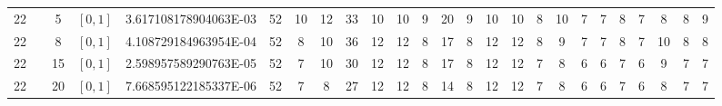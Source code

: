 \documentclass{article}
\begin{document}
\begin{landscape}
\begin{longtable}{ccccccccccccccccccccccccc}
  22 &  & 5          & $[0,1]$ & 3.617108178904063E-03 & \cellcolor{red!75} 52        &\cellcolor{green!5} 10        &\cellcolor{green!5} 12        &\cellcolor{red!5} 33        &\cellcolor{green!5} 10        &\cellcolor{green!5} 10        &\cellcolor{green!5} 9         &\cellcolor{red!5} 20        &\cellcolor{green!5} 9         &\cellcolor{green!5} 10        &\cellcolor{green!5} 10        &\cellcolor{green!5} 8         &\cellcolor{green!5} 10        &\cellcolor{green!25} 7         &\cellcolor{green!25} 7         &\cellcolor{green!5} 8         &\cellcolor{green!25} 7         &\cellcolor{green!5} 8         &\cellcolor{green!5} 8         &\cellcolor{green!5} 9\\
  22 &  & 8          & $[0,1]$ & 4.108729184963954E-04 & \cellcolor{red!75} 52        &\cellcolor{green!5} 8         &\cellcolor{green!5} 10        &\cellcolor{red!5} 36        &\cellcolor{green!5} 12        &\cellcolor{green!5} 12        &\cellcolor{green!5} 8         &\cellcolor{red!5} 17        &\cellcolor{green!5} 8         &\cellcolor{green!5} 12        &\cellcolor{green!5} 12        &\cellcolor{green!5} 8         &\cellcolor{green!5} 9         &\cellcolor{green!25} 7         &\cellcolor{green!25} 7         &\cellcolor{green!5} 8         &\cellcolor{green!25} 7         &\cellcolor{green!5} 10        &\cellcolor{green!5} 8         &\cellcolor{green!5} 8\\
  22 &  & 15         & $[0,1]$ & 2.598957589290763E-05 & \cellcolor{red!75} 52        &\cellcolor{green!5} 7         &\cellcolor{green!5} 10        &\cellcolor{red!5} 30        &\cellcolor{red!5} 12        &\cellcolor{red!5} 12        &\cellcolor{green!5} 8         &\cellcolor{red!5} 17        &\cellcolor{green!5} 8         &\cellcolor{red!5} 12        &\cellcolor{red!5} 12        &\cellcolor{green!5} 7         &\cellcolor{green!5} 8         &\cellcolor{green!25} 6         &\cellcolor{green!25} 6         &\cellcolor{green!5} 7         &\cellcolor{green!25} 6         &\cellcolor{green!5} 9         &\cellcolor{green!5} 7         &\cellcolor{green!5} 7\\
  22 &  & 20         & $[0,1]$ & 7.668595122185337E-06 & \cellcolor{red!75} 52        &\cellcolor{green!5} 7         &\cellcolor{green!5} 8         &\cellcolor{red!5} 27        &\cellcolor{red!5} 12        &\cellcolor{red!5} 12        &\cellcolor{green!5} 8         &\cellcolor{red!5} 14        &\cellcolor{green!5} 8         &\cellcolor{red!5} 12        &\cellcolor{red!5} 12        &\cellcolor{green!5} 7         &\cellcolor{green!5} 8         &\cellcolor{green!25} 6         &\cellcolor{green!25} 6         &\cellcolor{green!5} 7         &\cellcolor{green!25} 6         &\cellcolor{green!5} 8         &\cellcolor{green!5} 7         &\cellcolor{green!5} 7\\\hline

\end{longtable}
\end{landscape}
\end{document}
